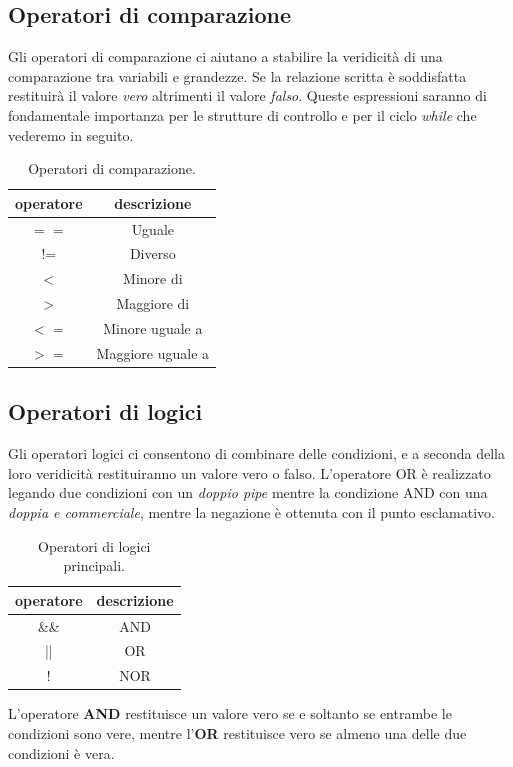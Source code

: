 \documentclass[11pt,fleqn]{book} %
\begin{document}
\subsection{Operatori di comparazione}
Gli operatori di comparazione ci aiutano a stabilire la veridicità di una comparazione tra variabili e grandezze. Se la relazione scritta è soddisfatta restituirà il valore \textit{vero} altrimenti il valore \textit{falso}. Queste espressioni saranno di fondamentale importanza per le strutture di controllo e per il ciclo \textit{while} che vederemo in seguito.
\begin{table}[h]
\centering
\begin{tabular}{c|c}
 operatore &	descrizione\\
 \hline
$==$ &	Uguale\\
 \hline
!= &	Diverso\\
 \hline
$<$ &	Minore di\\
 \hline
$>$ &	Maggiore di\\
 \hline
$<=$ &	Minore uguale a \\
 \hline
$>=$ &	Maggiore uguale a\\
\end{tabular}
\caption{Operatori di comparazione. \label{taboc}}
\end{table}
\subsection{Operatori di logici}

Gli operatori logici ci consentono di combinare delle condizioni, e a seconda della loro veridicità restituiranno un valore vero o falso. L'operatore OR è realizzato legando due condizioni con un \textit{doppio pipe} mentre la condizione AND con una \textit{doppia e commerciale}, mentre la negazione è ottenuta con il punto esclamativo.
\begin{table}[h]
\centering
\begin{tabular}{c|c}
 operatore &	descrizione\\
 \hline
\&\& &	AND\\
 \hline
|| &	OR\\
 \hline
! &	NOR\\
\end{tabular}
\caption{Operatori di logici principali. \label{tabok}}
\end{table}

L'operatore \textbf{AND} restituisce un valore vero se e soltanto se entrambe le condizioni sono vere, mentre l'\textbf{OR} restituisce vero se almeno una delle due condizioni è vera.
\end{document}
